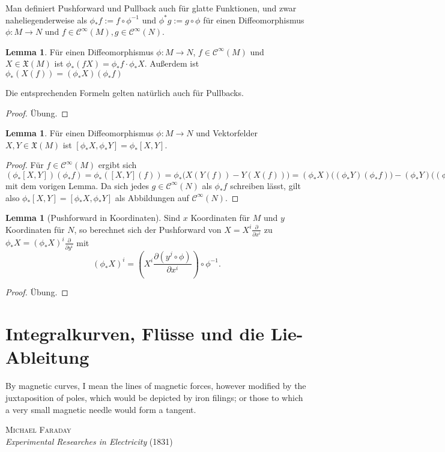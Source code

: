 \documentclass[a4paper]{scrreprt}
\numberwithin{equation}{chapter}
\newcommand{\sC}{\mathcal{C}^{\infty}}
\theoremstyle{definition}
\newtheorem{lemma}[defn]{Lemma}
\newcommand{\bewUeb}{\begin{proof}Übung.\end{proof}}
\begin{document}
Man definiert Pushforward und Pullback auch für glatte Funktionen, und zwar naheliegenderweise als $\phi_*f := f \circ \phi^{-1}$ und $\phi^*g := g \circ \phi$ für einen Diffeomorphismus $\phi\colon M \to N$ und $f \in \sC(M), g \in \sC(N)$.

\begin{lemma} \label{lemma:transport_VF_funk}
	Für einen Diffeomorphismus $\phi\colon M \to N$, $f \in \sC(M)$ und $X \in \mathfrak X(M)$ ist $\phi_*(f X) = \phi_*f \cdot \phi_*X$. Außerdem ist $\phi_*(X(f)) = (\phi_*X)(\phi_*f)$

	Die entsprechenden Formeln gelten natürlich auch für Pullbacks.
	\bewUeb
\end{lemma}

\begin{lemma}
	Für einen Diffeomorphismus $\phi\colon M \to N$ und Vektorfelder $X, Y \in \mathfrak X(M)$ ist $[\phi_*X,\phi_*Y] = \phi_*[X,Y]$.

	\begin{proof}
		Für $f \in \sC(M)$ ergibt sich $(\phi_*[X,Y])(\phi_*f) = \phi_*([X,Y](f)) = \phi_*\Big(X(Y(f)) - Y(X(f))\Big) = (\phi_*X)\Big((\phi_*Y)(\phi_*f)\Big) - (\phi_*Y)\Big((\phi_*X)(\phi_*f)\Big) = [\phi_*X,\phi_*Y](\phi_*f)$ mit dem vorigen Lemma. Da sich jedes $g\in \sC(N)$ als $\phi_*f$ schreiben lässt, gilt also $\phi_*[X,Y] = [\phi_*X,\phi_*Y]$ als Abbildungen auf $\sC(N)$.
	\end{proof}
\end{lemma}

\begin{lemma}[Pushforward in Koordinaten]
	Sind $x$ Koordinaten für $M$ und $y$ Koordinaten für $N$, so berechnet sich der Pushforward von $X = X^i \frac{\partial}{\partial x^i}$ zu $\phi_*X = (\phi_*X)^i \frac{\partial}{\partial y^i}$ mit
	\[(\phi_*X)^i = \left(X^i \frac{\partial (y^j \circ \phi)}{\partial x^i}\right) \circ \phi^{-1}.\]
	\bewUeb
\end{lemma}

\section{Integralkurven, Flüsse und die Lie-Ableitung}
\epigraph{By magnetic curves, I mean the lines of magnetic forces, however modified by the juxtaposition of poles, which would be depicted by iron filings; or those to which a very small magnetic needle would form a tangent.}
{\textsc{Michael Faraday}\\\emph{Experimental Researches in Electricity} (1831)}
\end{document}
